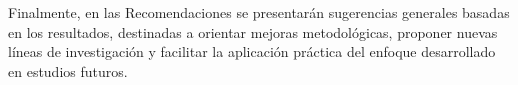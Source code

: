 Finalmente, en las Recomendaciones se presentarán sugerencias 
generales basadas en los resultados, destinadas a 
orientar mejoras metodológicas, proponer nuevas líneas de 
investigación y facilitar la aplicación práctica del enfoque 
desarrollado en estudios futuros.  










